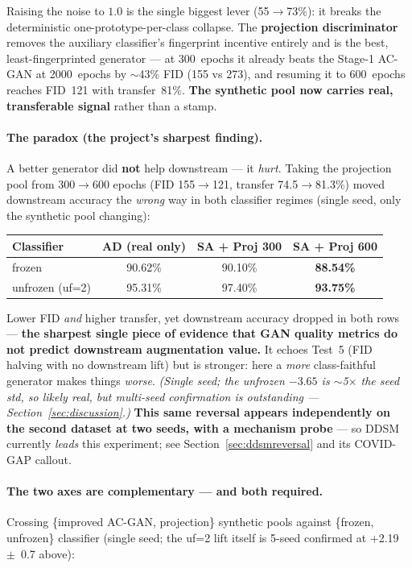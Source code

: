 \documentclass[11pt]{article}
\begin{document}
\noindent Raising the noise to $1.0$ is the single biggest lever
(55$\to$73\%): it breaks the deterministic one-prototype-per-class collapse. The
\textbf{projection discriminator} removes the auxiliary classifier's fingerprint
incentive entirely and is the best, least-fingerprinted generator --- at 300~epochs
it already beats the Stage-1 AC-GAN at 2000~epochs by $\sim$43\% FID (155 vs 273), and
resuming it to 600~epochs reaches FID~121 with transfer~81\%. \textbf{The synthetic
pool now carries real, transferable signal} rather than a stamp.

\paragraph{The paradox (the project's sharpest finding).} A better generator did
\textbf{not} help downstream --- it \emph{hurt}. Taking the projection pool from
300$\to$600 epochs (FID 155$\to$121, transfer 74.5$\to$81.3\%) moved downstream
accuracy the \emph{wrong} way in both classifier regimes (single seed, only the
synthetic pool changing):

\begin{table}[htbp]
\centering\small
\begin{tabular}{@{}lccc@{}}
\toprule
\textbf{Classifier} & \textbf{AD (real only)} & \textbf{SA + Proj 300} & \textbf{SA + Proj 600} \\
\midrule
frozen           & 90.62\% & 90.10\% & \textbf{88.54\%} \\
unfrozen (uf=2)  & 95.31\% & 97.40\% & \textbf{93.75\%} \\
\bottomrule
\end{tabular}
\end{table}

\noindent Lower FID \emph{and} higher transfer, yet downstream accuracy dropped in
both rows --- \textbf{the sharpest single piece of evidence that GAN quality metrics
do not predict downstream augmentation value.} It echoes Test~5 (FID halving with no
downstream lift) but is stronger: here a \emph{more} class-faithful generator makes
things \emph{worse}. \emph{(Single seed; the unfrozen $-3.65$ is $\sim$5$\times$ the
seed std, so likely real, but multi-seed confirmation is outstanding ---
Section~\ref{sec:discussion}.)} \textbf{This same reversal appears independently on
the second dataset at two seeds, with a mechanism probe} --- so DDSM currently
\emph{leads} this experiment; see Section~\ref{sec:ddsmreversal} and its COVID-GAP
callout.

\paragraph{The two axes are complementary --- and both required.} Crossing
\{improved AC-GAN, projection\} synthetic pools against \{frozen, unfrozen\}
classifier (single seed; the uf=2 lift itself is 5-seed confirmed at +2.19~$\pm$~0.7
above):
\end{document}
